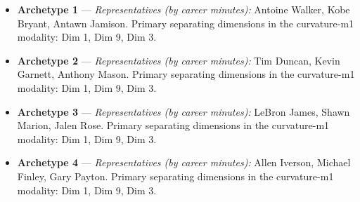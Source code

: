 \begin{itemize}
\item \textbf{Archetype 1} --- \emph{Representatives (by career minutes):} Antoine Walker, Kobe Bryant, Antawn Jamison. Primary separating dimensions in the curvature-m1 modality: Dim 1, Dim 9, Dim 3.
\item \textbf{Archetype 2} --- \emph{Representatives (by career minutes):} Tim Duncan, Kevin Garnett, Anthony Mason. Primary separating dimensions in the curvature-m1 modality: Dim 1, Dim 9, Dim 3.
\item \textbf{Archetype 3} --- \emph{Representatives (by career minutes):} LeBron James, Shawn Marion, Jalen Rose. Primary separating dimensions in the curvature-m1 modality: Dim 1, Dim 9, Dim 3.
\item \textbf{Archetype 4} --- \emph{Representatives (by career minutes):} Allen Iverson, Michael Finley, Gary Payton. Primary separating dimensions in the curvature-m1 modality: Dim 1, Dim 9, Dim 3.
\end{itemize}
